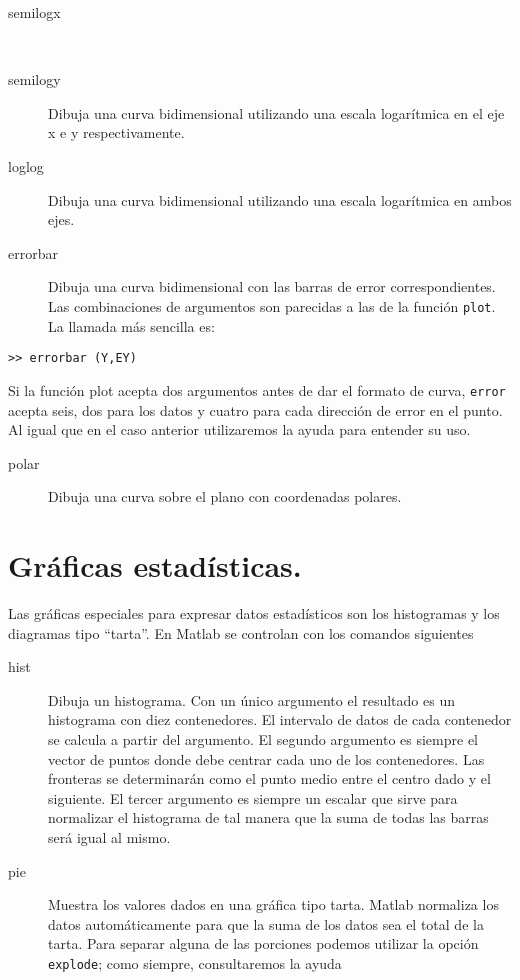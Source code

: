 \begin{description}
\item [semilogx]~
\item [semilogy\texttt{}]Dibuja una curva bidimensional
utilizando una escala logarítmica en el eje x e y respectivamente.
\item [loglog\texttt{}]Dibuja una curva bidimensional utilizando
una escala logarítmica en ambos ejes.
\item [errorbar\texttt{}]Dibuja una curva bidimensional
con las barras de error correspondientes. Las combinaciones de argumentos
son parecidas a las de la función \texttt{plot}. La llamada más sencilla
es:
\end{description}
  \begin{verbatim}
>> errorbar (Y,EY)
 \end{verbatim}
Si la función plot acepta dos argumentos antes de dar el formato de
curva, \texttt{error} acepta seis, dos para los datos y cuatro para
cada dirección de error en el punto. Al igual que en el caso anterior
utilizaremos la ayuda para entender su uso.

\begin{description}
\item [polar\texttt{}]Dibuja una curva sobre el plano con
coordenadas polares.
\end{description}

\section{Gráficas estadísticas.}

Las gráficas especiales para expresar datos estadísticos son los histogramas
y los diagramas tipo {}``tarta''. En Matlab se controlan con los
comandos siguientes

\begin{description}
\item [hist\texttt{}]Dibuja un histograma. Con un único argumento
el resultado es un histograma con diez contenedores. El intervalo
de datos de cada contenedor se calcula a partir del argumento. El
segundo argumento es siempre el vector de puntos donde debe centrar
cada uno de los contenedores. Las fronteras se determinarán como el
punto medio entre el centro dado y el siguiente. El tercer argumento
es siempre un escalar que sirve para normalizar el histograma de tal
manera que la suma de todas las barras será igual al mismo.
\item [pie\texttt{}]Muestra los valores dados en una gráfica
tipo tarta. Matlab normaliza los datos automáticamente para que la
suma de los datos sea el total de la tarta. Para separar alguna de
las porciones podemos utilizar la opción \texttt{explode}; como siempre,
consultaremos la ayuda
\end{description}

